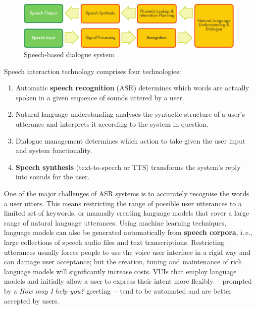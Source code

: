 \documentclass[]{../../metanetpaper}
\begin{document}
\begin{multicols}{2}
\begin{figure}[htb]
  \center
  \includegraphics[width=\textwidth]{../_media/english/simple_speech-based_dialogue_architecture}
  \caption{Speech-based dialogue system}
  \label{fig:dialoguearch_en}
\end{figure}

Speech interaction technology comprises four technologies: 

\begin{enumerate}
\item Automatic \textbf{speech recognition} (ASR) determines which words are actually spoken in a given sequence of sounds uttered by a user.  
\item Natural language understanding analyses the syntactic structure of a user’s utterance and interprets it according to the system in question.
\item Dialogue management determines which action to take given the user input and system functionality.   
\item \textbf{Speech synthesis} (text-to-speech or TTS) trans\-forms the system’s reply into sounds for the user.
\end{enumerate}

One of the major challenges of ASR systems is to accurately recognise the words a user utters. This means restricting the range of possible user utterances to a limited set of keywords, or manually creating language models that cover a large range of natural language utterances. Using machine learning techniques, language models can also be generated automatically from \textbf{speech corpora}, i.\,e., large collections of speech audio files and text transcriptions. Restricting utterances usually forces people to use the voice user interface in a rigid way and can damage user acceptance; but the creation, tuning and maintenance of rich language models will significantly increase costs. VUIs that employ language models and initially allow a user to express their intent more flexibly --~prompted by a \textit{How may I help you?} greeting~-- tend to be automated and are better accepted by users.


\end{multicols}
\end{document}

